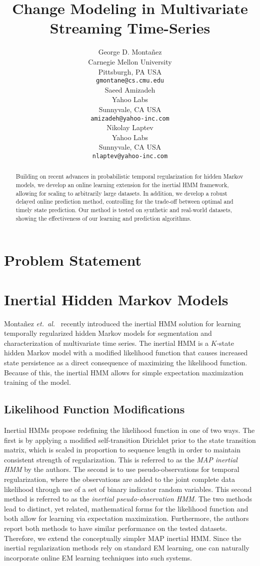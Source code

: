 \documentclass{article}
\title{Change Modeling in Multivariate Streaming Time-Series}
\author{George D. Monta\~nez \\
Carnegie Mellon University\\
Pittsburgh, PA USA\\
\texttt{gmontane@cs.cmu.edu} \\
\And
Saeed Amizadeh\\
Yahoo Labs\\
Sunnyvale, CA USA\\
\texttt{amizadeh@yahoo-inc.com}\\
\And
Nikolay Laptev\\
Yahoo Labs\\
Sunnyvale, CA USA\\
\texttt{nlaptev@yahoo-inc.com}}
\begin{document}
\maketitle

\begin{abstract}
Building on recent advances in probabilistic temporal regularization for hidden Markov models, we develop an online learning extension for the inertial HMM framework, allowing for scaling to arbitrarily large datasets. In addition, we develop a robust delayed online prediction method, controlling for the trade-off between optimal and timely state prediction. Our method is tested on synthetic and real-world datasets, showing the effectiveness of our learning and prediction algorithms.
\end{abstract}



\section{Problem Statement}

\section{Inertial Hidden Markov Models}

Monta\~nez \emph{et.\ al.}~ recently introduced the inertial HMM solution for learning temporally regularized hidden Markov models for segmentation and characterization of multivariate time series. The inertial HMM is a $K$-state hidden Markov model with a modified likelihood function that causes increased state persistence as a direct consequence of maximizing the likelihood function. Because of this, the inertial HMM allows for simple expectation maximization~\cite{dempster1977maximum} training of the model.

\subsection{Likelihood Function Modifications}
Inertial HMMs propose redefining the likelihood function in one of two ways. The first is by applying a modified self-transition Dirichlet prior to the state transition matrix, which is scaled in proportion to sequence length in order to maintain consistent strength of regularization. This is referred to as the \emph{MAP inertial HMM} by the authors. The second is to use pseudo-observations for temporal regularization, where the observations are added to the joint complete data likelihood through use of a set of binary indicator random variables. This second method is referred to as the \emph{inertial pseudo-observation HMM}. The two methods lead to distinct, yet related, mathematical forms for the likelihood function and both allow for learning via expectation maximization. Furthermore, the authors report both methods to have similar performance on the tested datasets. Therefore, we extend the conceptually simpler MAP inertial HMM. Since the inertial regularization methods rely on standard EM learning, one can naturally incorporate online EM learning techniques into such systems.
\end{document}
